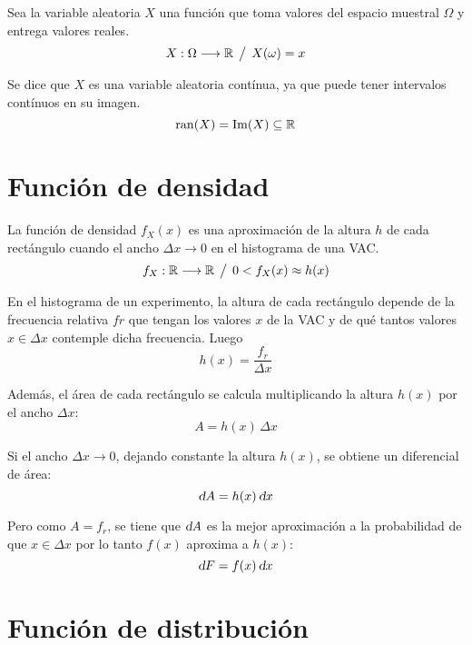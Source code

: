Sea la variable aleatoria $X$ una función que toma valores del espacio muestral $\Omega$ y entrega valores reales.
\begin{equation*}
    X: \Omega \longrightarrow \mathbb{R} \hspace{1ex} \big/ \hspace{1ex} X(\omega) = x
\end{equation*}

Se dice que $X$ es una variable aleatoria contínua, ya que puede tener intervalos contínuos en su imagen.
\begin{equation*}
    \operatorname{ran}(X) = \operatorname{Im}(X) \subseteq \mathbb{R}
\end{equation*}


\section{Función de densidad}

La función de densidad $f_X(x)$ es una aproximación de la altura $h$ de cada rectángulo cuando el ancho $\Delta x \to 0$ en el histograma de una VAC.
\begin{equation*}
    f_X: \mathbb{R} \longrightarrow \mathbb{R} \hspace{1ex} \big/ \hspace{1ex} 0 < f_X(x) \approx h(x)
\end{equation*}

En el histograma de un experimento, la altura de cada rectángulo depende de la frecuencia relativa $fr$ que tengan los valores $x$ de la VAC y de qué tantos valores $x \in \Delta x$ contemple dicha frecuencia.
Luego
\begin{equation*}
    h(x) = \frac{f_r}{\Delta x}
\end{equation*}

Además, el área de cada rectángulo se calcula multiplicando la altura $h(x)$ por el ancho $\Delta x$:
\begin{equation*}
    A = h(x) \, \Delta x
\end{equation*}

Si el ancho $\Delta x \to 0$, dejando constante la altura $h(x)$, se obtiene un diferencial de área:
\begin{equation*}
    \textsl{d} A = h(x) \, \textsl{d} x
\end{equation*}

Pero como $A=f_r$, se tiene que $\textsl{d} A$ es la mejor aproximación a la probabilidad de que $x \in \Delta x$ por lo tanto $f(x)$ aproxima a $h(x)$:
\begin{equation*}
    \textsl{d} F = f(x) \, \textsl{d} x
\end{equation*}


\section{Función de distribución}

